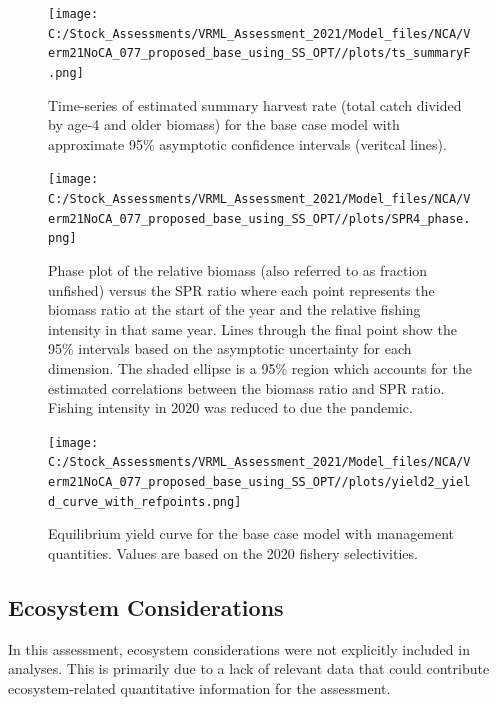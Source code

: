 \documentclass[11pt,
  english,
  a4paper,
]{article}
\begin{document}
\begin{figure}
\centering
\texttt{[image: C:/Stock\_Assessments/VRML\_Assessment\_2021/Model\_files/NCA/Verm21NoCA\_077\_proposed\_base\_using\_SS\_OPT//plots/ts\_summaryF.png]}
\caption{Time-series of estimated summary harvest rate (total catch divided by age-4 and older biomass) for the base case model with approximate 95\% asymptotic confidence intervals (veritcal lines).\label{fig:FmortalityES}}
\end{figure}

\begin{figure}
\centering
\texttt{[image: C:/Stock\_Assessments/VRML\_Assessment\_2021/Model\_files/NCA/Verm21NoCA\_077\_proposed\_base\_using\_SS\_OPT//plots/SPR4\_phase.png]}
\caption{Phase plot of the relative biomass (also referred to as fraction unfished) versus the SPR ratio where each point represents the biomass ratio at the start of the year and the relative fishing intensity in that same year. Lines through the final point show the 95\% intervals based on the asymptotic uncertainty for each dimension. The shaded ellipse is a 95\% region which accounts for the estimated correlations between the biomass ratio and SPR ratio. Fishing intensity in 2020 was reduced to due the pandemic.\label{fig:phaseES}}
\end{figure}

\begin{figure}
\centering
\texttt{[image: C:/Stock\_Assessments/VRML\_Assessment\_2021/Model\_files/NCA/Verm21NoCA\_077\_proposed\_base\_using\_SS\_OPT//plots/yield2\_yield\_curve\_with\_refpoints.png]}
\caption{Equilibrium yield curve for the base case model with management quantities. Values are based on the 2020 fishery selectivities.\label{fig:yield2ES}}
\end{figure}

\FloatBarrier


\hypertarget{ecosystem-considerations}{%
\subsection*{Ecosystem Considerations}\label{ecosystem-considerations}}

\leavevmode\tagmcend\tagstructend

In this assessment, ecosystem considerations were not explicitly included in analyses. This is primarily due to a lack of relevant data that could contribute ecosystem-related quantitative information for the assessment.
\end{document}
